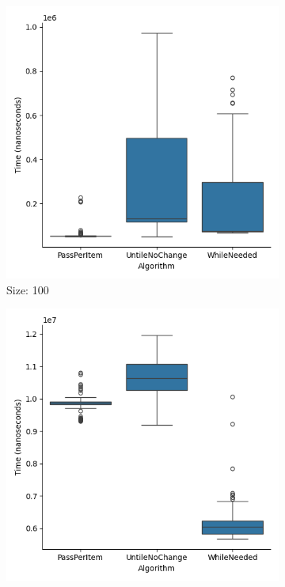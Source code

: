 \documentclass{article}
\begin{document}
\begin{figure}[ht]
  \centering
  \begin{subfigure}{0.3\textwidth}
    \centering
    \includegraphics[width=\linewidth]{../figureInt100.png}
    \caption{Size: 100}
    \label{fig:img1}
  \end{subfigure}
  \begin{subfigure}{0.3\textwidth}
    \centering
    \includegraphics[width=\linewidth]{../figureInt1000.png}

\end{subfigure}
\end{figure}
\end{document}
